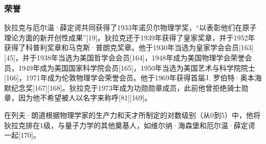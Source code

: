 \subsubsection{荣誉}  
狄拉克与厄尔温·薛定谔共同获得了1933年诺贝尔物理学奖，“以表彰他们在原子理论方面的新开创性成果”[19]。狄拉克还于1939年获得了皇家奖章，并于1952年获得了科普利奖章和马克斯·普朗克奖章。他于1930年当选为皇家学会会员[163][45]，并于1938年当选为美国哲学会会员[164]，1948年成为美国物理学会荣誉会员，1949年成为美国国家科学院会员[165]，1950年当选为美国艺术与科学院院士[166]，1971年成为伦敦物理学会荣誉会员。他于1969年获得首届J. 罗伯特·奥本海默纪念奖[167][168]。狄拉克于1973年成为功勋勋章成员，此前他曾拒绝骑士勋章，因为他不希望被人以名字来称呼[81][169]。

在列夫·朗道根据物理学家的生产力和天才所制定的对数级别（从0到5）中，他将狄拉克排在1级，与量子力学的其他奠基人，如维尔纳·海森堡和厄尔温·薛定谔一起[170]。
